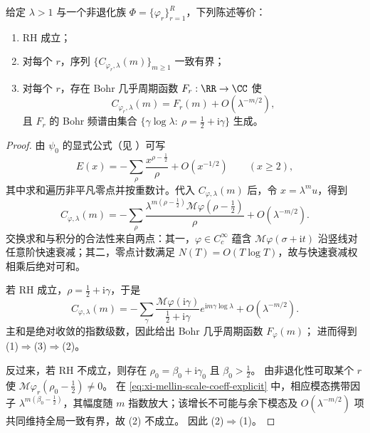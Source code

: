 \begin{theorem}\label{thm:xi-mellin-scale-bohr-rh-equivalence}
给定 \(\lambda>1\) 与一个非退化族 \(\Phi=\{\varphi_r\}_{r=1}^R\)，下列陈述等价：
\begin{enumerate}
  \item RH 成立；
  \item 对每个 \(r\)，序列 \(\{C_{\varphi_r,\lambda}(m)\}_{m\ge 1}\) 一致有界；
  \item 对每个 \(r\)，存在 Bohr 几乎周期函数 \(F_r:\RR\to\CC\) 使
  \[
  C_{\varphi_r,\lambda}(m)=F_r(m)+O(\lambda^{-m/2}),
  \]
  且 \(F_r\) 的 Bohr 频谱由集合
  \(\{\gamma\log\lambda:\ \rho=\frac12+\mathrm{i}\gamma\}\) 生成。
\end{enumerate}
\end{theorem}
\begin{proof}
由 \(\psi_0\) 的显式公式（见 \cite{Titchmarsh1986RiemannZeta}）可写
\[
E(x)=
-\sum_{\rho}\frac{x^{\rho-\frac12}}{\rho}
+O(x^{-1/2})\qquad (x\ge 2),
\]
其中求和遍历非平凡零点并按重数计。代入 \(C_{\varphi,\lambda}(m)\) 后，令 \(x=\lambda^m u\)，得到
\begin{equation}\label{eq:xi-mellin-scale-coeff-explicit}
C_{\varphi,\lambda}(m)
=-\sum_{\rho}
\frac{\lambda^{m(\rho-\frac12)}\mathcal M\varphi(\rho-\frac12)}{\rho}
+O(\lambda^{-m/2}).
\end{equation}
交换求和与积分的合法性来自两点：其一，\(\varphi\in C_c^\infty\) 蕴含
\(\mathcal M\varphi(\sigma+\mathrm{i}t)\) 沿竖线对任意阶快速衰减；其二，零点计数满足
\(N(T)=O(T\log T)\)，故与快速衰减权相乘后绝对可和。

若 RH 成立，\(\rho=\frac12+\mathrm{i}\gamma\)，于是
\[
C_{\varphi,\lambda}(m)
=-\sum_{\gamma}
\frac{\mathcal M\varphi(\mathrm{i}\gamma)}{\frac12+\mathrm{i}\gamma}
e^{\mathrm{i}m\gamma\log\lambda}
+O(\lambda^{-m/2}).
\]
主和是绝对收敛的指数级数，因此给出 Bohr 几乎周期函数 \(F_\varphi(m)\)；
进而得到 (1)\(\Rightarrow\)(3)\(\Rightarrow\)(2)。

反过来，若 RH 不成立，则存在 \(\rho_0=\beta_0+\mathrm{i}\gamma_0\) 且 \(\beta_0>\frac12\)。
由非退化性可取某个 \(r\) 使
\(\mathcal M\varphi_r(\rho_0-\frac12)\neq 0\)。
在 \eqref{eq:xi-mellin-scale-coeff-explicit} 中，相应模态携带因子
\(\lambda^{m(\beta_0-\frac12)}\)，其幅度随 \(m\) 指数放大；该增长不可能与余下模态及 \(O(\lambda^{-m/2})\) 项共同维持全局一致有界，故 (2) 不成立。
因此 (2)\(\Rightarrow\)(1)。
\end{proof}

